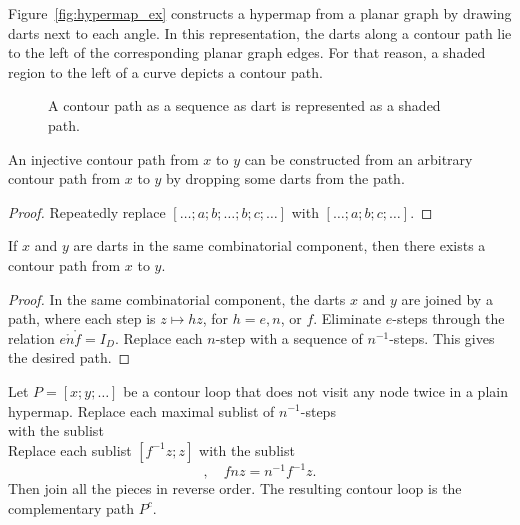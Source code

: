 \begin{remark} Figure~\ref{fig:hypermap_ex} constructs a hypermap from
a planar graph by drawing darts next to each angle.  In this
representation, the darts along a contour path lie to the left of
the corresponding planar graph edges.  For that reason, a shaded
region to the left of a curve depicts a contour path.
\end{remark}

\begin{figure}[htb]
\centering
{}
\caption{A contour path as a sequence as dart is represented as a
shaded path.}
\label{fig:shade-dart}
\end{figure}

\begin{lemma} An injective contour path from
$x$ to $y$ can be constructed from an arbitrary contour path from
$x$ to $y$ by dropping some darts from the path.
\end{lemma}

\begin{proof} Repeatedly replace $[\ldots;a;b;\ldots;b;c;\ldots]$ with
$[\ldots;a;b;c;\ldots]$.
\end{proof}





\begin{lemma}  
If $x$ and $y$ are darts in the same combinatorial component, then
there exists a contour path from $x$ to $y$.
\end{lemma}

\begin{proof} 
In the same combinatorial component, the darts $x$ and $y$ are
joined by a path, where each step is $z\mapsto h z$, for $h=e,n$, or
$f$.  Eliminate $e$-steps through the relation $e\ocirc n\ocirc f =
I_D$.  Replace each $n$-step with a sequence of $n^{-1}$-steps.  This
gives the desired path.
\end{proof}
%

\begin{definition} 
Let $P=[x;y;\ldots]$ be a contour loop that does not visit any node
twice in a plain hypermap.  Replace each maximal sublist of
$n^{-1}$-steps
\begin{displaymath}
[z;n^{-1} z; \ldots; n^{-k} z]
\end{displaymath}
with the sublist
\begin{displaymath}
[n^{-(k+1)} z;n^{-(k+2)} z;\ldots; n z]
\end{displaymath}
Replace each sublist $[f^{-1} z;z]$ with the sublist
\begin{displaymath}
[n z; f n z],\quad f n z = n^{-1} f^{-1} z.
\end{displaymath}
Then join all the pieces in reverse order. The resulting contour loop
is the complementary path $P^c$.  %
\end{definition}

